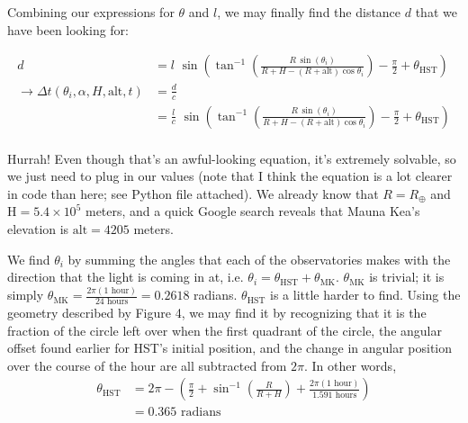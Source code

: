 \documentclass[12pt]{article}
\begin{document}
\begin{onehalfspacing}
Combining our expressions for $\theta$ and $l$, we may finally find the distance $d$ that we have been looking for:


\begin{align*}
  d &= l \,\, \sin \left( \tan^{-1} \left(   \frac{R \, \sin(\theta_i)}{R + H - (R + \text{alt}) \cos{\theta_i}} \right) - \frac{\pi}{2} + \theta_{\text{HST}} \right) \\
  \rightarrow \Delta t (\theta_i, \alpha, H, \text{alt}, t) &= \frac{d}{c} \\
                       &= \frac{l}{c} \,\, \sin \left( \tan^{-1} \left(   \frac{R \, \sin(\theta_i)}{R + H - (R + \text{alt}) \cos{\theta_i}} \right) - \frac{\pi}{2} + \theta_{\text{HST}} \right) \\
\end{align*}

Hurrah! Even though that's an awful-looking equation, it's extremely solvable, so we just need to plug in our values (note that I think the equation is a lot clearer in code than here; see Python file attached). We already know that $R = R_{\oplus}$ and $\text{H} = 5.4 \times 10^5$ meters, and a quick Google search reveals that Mauna Kea's elevation is $\text{alt}=4205$ meters.

\bigskip
\bigskip

We find $\theta_i$ by summing the angles that each of the observatories makes with the direction that the light is coming in at, i.e. $\theta_i = \theta_{\text{HST}} + \theta_{\text{MK}}$. $\theta_{\text{MK}}$ is trivial; it is simply $\theta_{\text{MK}} = \frac{2 \pi (1 \text{ hour})}{24 \text{ hours}} = 0.2618$ radians. $\theta_{\text{HST}}$ is a little harder to find. Using the geometry described by Figure 4, we may find it by recognizing that it is the fraction of the circle left over when the first quadrant of the circle, the angular offset found  earlier for HST's initial position, and the change in angular position over the course of the hour are all subtracted from $2 \pi$. In other words,
\begin{align*}
  \theta_{\text{HST}} &= 2 \pi - \left(\frac{\pi}{2} + \sin^{-1} \left( \frac{R}{R + H}\right) + \frac{2 \pi (1 \text{ hour})}{1.591 \text{ hours}} \right) \\
                      &= 0.365 \text{ radians} \\
\end{align*}


\end{onehalfspacing}
\end{document}
